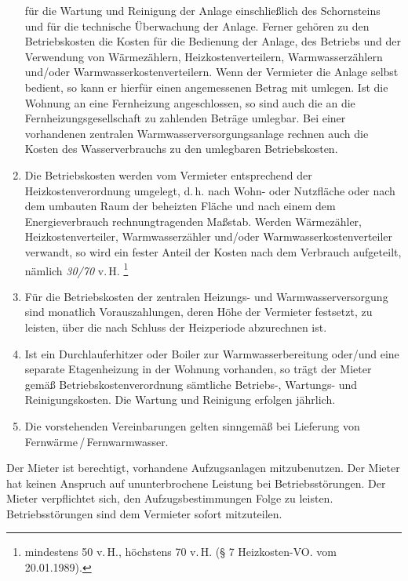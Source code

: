 \documentclass{scrreprt}[12pt,a4paper,twoside,duplex]
\begin{document}
\begin{contract}
\begin{enumerate}
  für die Wartung und Reinigung der Anlage einschließlich des Schornsteins und
  für die technische Überwachung der Anlage. Ferner gehören zu den
  Betriebskosten die Kosten für die Bedienung der Anlage, des Betriebs und der
  Verwendung von Wärmezählern, Heizkostenverteilern, Warmwasserzählern und/oder
  Warmwasserkostenverteilern. Wenn der Vermieter die Anlage selbst bedient, so
  kann er hierfür einen angemessenen Betrag mit umlegen. Ist die Wohnung an eine
  Fernheizung angeschlossen, so sind auch die an die Fernheizungsgesellschaft zu
  zahlenden Beträge umlegbar. Bei einer vorhandenen zentralen
  Warmwasserversorgungsanlage rechnen auch die Kosten des Wasserverbrauchs zu
  den umlegbaren Betriebskosten.
  \item Die Betriebskosten werden vom Vermieter entsprechend der
  Heizkostenverordnung umgelegt, d.\,h. nach Wohn- oder Nutzfläche oder nach dem
  umbauten Raum der beheizten Fläche und nach einem dem Energieverbrauch
  rechnungtragenden Maßstab. Werden Wärmezähler, Heizkostenverteiler,
  Warmwasserzähler und/oder Warmwasserkostenverteiler verwandt, so wird ein
  fester Anteil der Kosten nach dem Verbrauch aufgeteilt, nämlich \textsl{30/70}
  v.\,H. \footnote{mindestens 50 v.\,H., höchstens 70 v.\,H. (§ 7 Heizkosten-VO.
  vom 20.01.1989).}
  \item Für die Betriebskosten der zentralen Heizungs- und Warmwasserversorgung
  sind monatlich Vorauszahlungen, deren Höhe der Vermieter festsetzt, zu
  leisten, über die nach Schluss der Heizperiode abzurechnen ist.
  \item Ist ein Durchlauferhitzer oder Boiler zur Warmwasserbereitung oder/und
  eine separate Etagenheizung in der Wohnung vorhanden, so trägt der Mieter
  gemäß Betriebskostenverordnung sämtliche Betriebs-, Wartungs- und
  Reinigungskosten. Die Wartung und Reinigung erfolgen jährlich.
  \item Die vorstehenden Vereinbarungen gelten sinngemäß bei Lieferung von
  Fe\-rn\-wä\-r\-me\,/\,Fe\-rn\-wa\-rm\-wa\-ss\-er.
\end{enumerate}
\end{contract}

\begin{contract}

Der Mieter ist berechtigt, vorhandene Aufzugsanlagen mitzubenutzen. Der Mieter
hat keinen Anspruch auf ununterbrochene Leistung bei Betriebsstörungen. Der
Mieter verpflichtet sich, den Aufzugsbestimmungen Folge zu leisten.
Betriebsstörungen sind dem Vermieter sofort mitzuteilen.

\end{contract}
\end{document}

